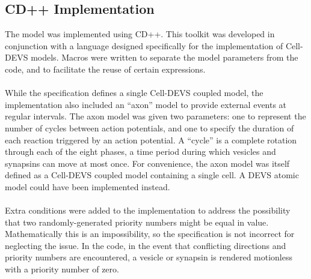 \documentclass{acm_proc_article-sp}
\begin{document}
\subsection{CD++ Implementation}
The model was implemented using CD++.
This toolkit was developed in conjunction with a 
language designed specifically for the implementation
of Cell-DEVS models.  Macros were written to
separate the model parameters from the code, and
to facilitate the reuse of certain expressions.\\
\\
While the specification defines a single Cell-DEVS
coupled model, the implementation also included an
``axon'' model to provide external events at regular 
intervals.  The
axon model was given two parameters: one to represent
the number of cycles between action potentials, and
one to specify the duration of each reaction triggered
by an action potential.  A ``cycle'' is a complete
rotation through each of the eight phases, a time period
during which vesicles and synapsins can move at most 
once.  For convenience, the axon model was itself 
defined as a Cell-DEVS coupled model containing a 
single cell.  A DEVS atomic model could have been 
implemented instead. \\
\\
Extra conditions were added to the implementation to
address the possibility that two randomly-generated
priority numbers might be equal in value.  
Mathematically this is an impossibility, so the
specification is not incorrect for neglecting the
issue.  In the code, in
the event that conflicting directions and priority 
numbers are encountered, a vesicle or synapsin is
rendered motionless with a priority number of zero.
\end{document}
